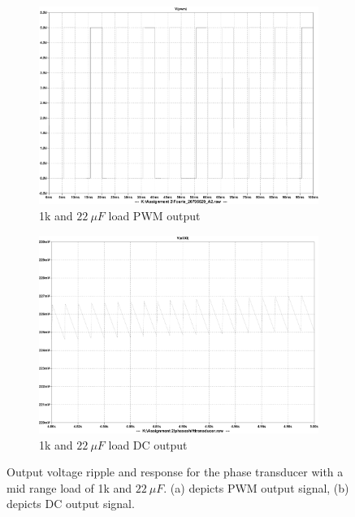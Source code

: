 \begin{figure}[h!]
 \centering
     \begin{subfigure}[]{0.45\textwidth}
        \centering
         \includegraphics[width=1\linewidth]{./Figures/phasetransducer1k22u.pdf}
		    \caption{1k and $\SI{22}{\mu F}$ load PWM output} \label{subfig:phasetransducer1k22u}
     \end{subfigure}
     \begin{subfigure}[]{0.45\textwidth}
        \centering
         \includegraphics[width=1\linewidth]{./Figures/phaseshifttransducermidanalogout.pdf}
		    \caption{1k and $\SI{22}{\mu F}$ load DC output} \label{subfig:phasetransducer1k22uout}
     \end{subfigure}
   \caption[Simulated results for the phase transducer with a mid range load]{Output voltage ripple and response for the phase transducer with a mid range load of 1k and $\SI{22}{\mu F}$. (a) depicts PWM output signal, (b) depicts DC output signal. }
    \label{fig:simulation_results_box}
 \end{figure}
 
